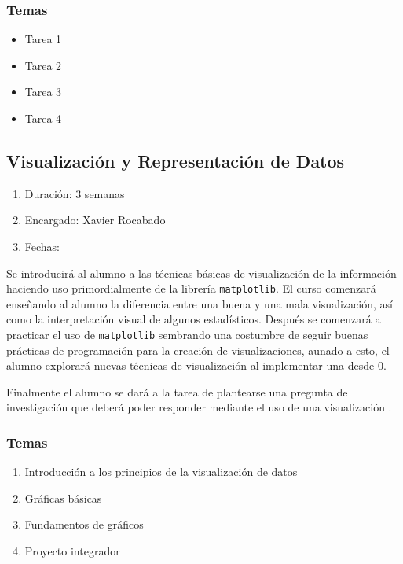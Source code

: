 \documentclass{article}
\begin{document}
            \subsubsection{Temas}

                \begin{itemize}
                    \item Tarea 1
                    \item Tarea 2
                    \item Tarea 3
                    \item Tarea 4
                \end{itemize}

        \subsection{Visualización y Representación de Datos}

            \begin{enumerate}
                \item Duración: 3 semanas
                \item Encargado: Xavier Rocabado
                \item Fechas:
            \end{enumerate}

            Se introducirá al alumno a las técnicas básicas de visualización de la información haciendo uso primordialmente de la librería \texttt{matplotlib}. El curso comenzará enseñando al alumno la diferencia entre una buena y una mala visualización, así como la interpretación visual de algunos estadísticos. Después se comenzará a practicar el uso de \texttt{matplotlib} sembrando una costumbre de seguir buenas prácticas de programación para la creación de visualizaciones, aunado a esto, el alumno explorará nuevas técnicas de visualización al implementar una desde 0. 
            
            Finalmente el alumno se dará a la tarea de plantearse una pregunta de investigación que deberá poder responder mediante el uso de una visualización \cite{plotting}.

            \subsubsection{Temas}

                \begin{enumerate}
                    \item Introducción a los principios de la visualización de datos
                    \item Gráficas básicas
                    \item Fundamentos de gráficos
                    \item Proyecto integrador
                \end{enumerate}
\end{document}
